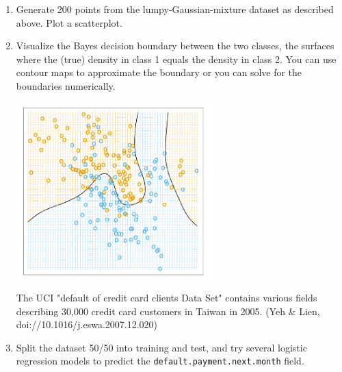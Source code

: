 \documentclass[12pt]{book}
\theoremstyle{definition}
\begin{document}
\begin{enumerate}
\item 
Generate 200 points from the lumpy-Gaussian-mixture dataset as described above.  Plot a scatterplot.

\item
Visualize the Bayes decision boundary between the two classes, the surfaces where the (true) density in class 1 equals the density in class 2.  You can use contour maps to approximate the boundary or you can solve for the boundaries numerically.

\includegraphics[width=3in]{src/hastie-bayesian.png}




The UCI "default of credit card clients Data Set" contains various fields describing 30,000 credit card customers in Taiwan in 2005. (Yeh \& Lien,  doi://10.1016/j.eswa.2007.12.020)   

\item
Split the dataset 50/50 into training and test, and try several logistic regression models to predict the \texttt{default.payment.next.month} field.  



\end{enumerate}
\end{document}
